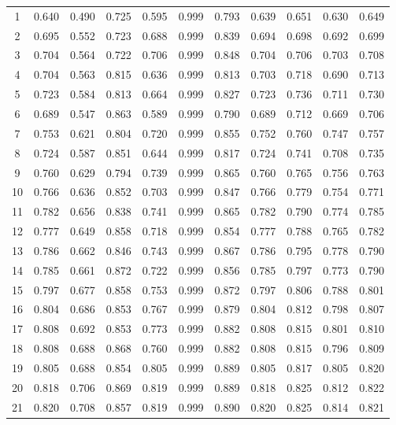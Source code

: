 \begin{longtable}[p]{|c|c|c|c|c|c|c|c|c|c|c|}
	1 & 0.640 & 0.490 & 0.725 & 0.595 & 0.999 & 0.793 & 0.639 & 0.651 & 0.630 & 0.649\\
	2 & 0.695 & 0.552 & 0.723 & 0.688 & 0.999 & 0.839 & 0.694 & 0.698 & 0.692 & 0.699 \\
	3 & 0.704 & 0.564 & 0.722 & 0.706 & 0.999 & 0.848 & 0.704 & 0.706 & 0.703 & 0.708\\
	4 & 0.704 & 0.563 & 0.815 & 0.636 & 0.999 & 0.813 & 0.703 & 0.718 & 0.690 & 0.713\\
	5 & 0.723 & 0.584 & 0.813 & 0.664 & 0.999 & 0.827 & 0.723 & 0.736 & 0.711 & 0.730\\
	6 & 0.689 & 0.547 & 0.863 & 0.589 & 0.999 & 0.790 & 0.689 & 0.712 & 0.669 & 0.706\\
	7 & 0.753 & 0.621 & 0.804 & 0.720 & 0.999 & 0.855 & 0.752 & 0.760 & 0.747 & 0.757\\
	8 & 0.724 & 0.587 & 0.851 & 0.644 & 0.999 & 0.817 & 0.724 & 0.741 & 0.708 & 0.735 \\
	9 & 0.760 & 0.629 & 0.794 & 0.739 & 0.999 & 0.865 & 0.760 & 0.765 & 0.756 & 0.763\\
	10 & 0.766 & 0.636 & 0.852 & 0.703 & 0.999 & 0.847 & 0.766 & 0.779 & 0.754 & 0.771\\
	11 & 0.782 & 0.656 & 0.838 & 0.741 & 0.999 & 0.865 & 0.782 & 0.790 & 0.774 & 0.785\\
	12 & 0.777 & 0.649 & 0.858 & 0.718 & 0.999 & 0.854 & 0.777 & 0.788 & 0.765 & 0.782\\
	13 & 0.786 & 0.662 & 0.846 & 0.743 & 0.999 & 0.867 & 0.786 & 0.795 & 0.778 & 0.790\\
	14 & 0.785 & 0.661 & 0.872 & 0.722 & 0.999 & 0.856 & 0.785 & 0.797 & 0.773 & 0.790\\
	15 & 0.797 & 0.677 & 0.858 & 0.753 & 0.999 & 0.872 & 0.797 & 0.806 & 0.788 & 0.801\\
	16 & 0.804 & 0.686 & 0.853 & 0.767 & 0.999 & 0.879 & 0.804 & 0.812 & 0.798 & 0.807\\
	17 & 0.808 & 0.692 & 0.853 & 0.773 & 0.999 & 0.882 & 0.808 & 0.815 & 0.801 & 0.810\\
	18 & 0.808 & 0.688 & 0.868 & 0.760 & 0.999 & 0.882 & 0.808 & 0.815 & 0.796 & 0.809\\
	19 & 0.805 & 0.688 & 0.854 & 0.805 & 0.999 & 0.889 & 0.805 & 0.817 & 0.805 & 0.820\\
	20 & 0.818 & 0.706 & 0.869 & 0.819 & 0.999 & 0.889 & 0.818 & 0.825 & 0.812 & 0.822\\
	21 & 0.820 & 0.708 & 0.857 & 0.819 & 0.999 & 0.890 & 0.820 & 0.825 & 0.814 & 0.821\\

\end{longtable}
